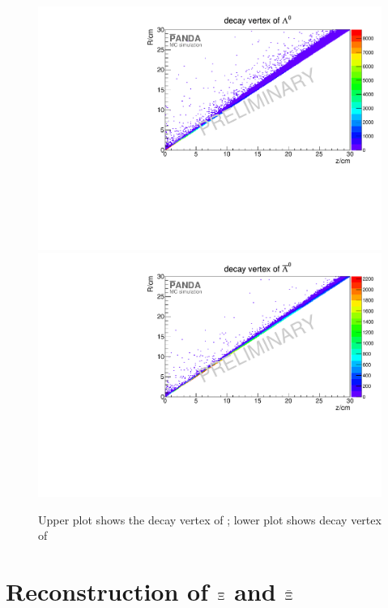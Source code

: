 		\begin{figure}
		
			\centering
			\includegraphics[width=1.\textwidth]{./plots/lambda0/lambda0_decay_vtx.pdf}
			\includegraphics[width=1.\textwidth]{./plots/antilambda0/antiLambda0_decay_vtx.pdf}
			\caption{\propose Upper plot shows the decay vertex of \lam; lower plot shows decay vertex of \alam}
			\label{fig:lambda0_antilambda0_decay_vtx}
		
		\end{figure}
		
		
		
		
	
\section{Reconstruction of $\boldmath{\Xi}$ and $\boldmath{\bar{\Xi}}$}
